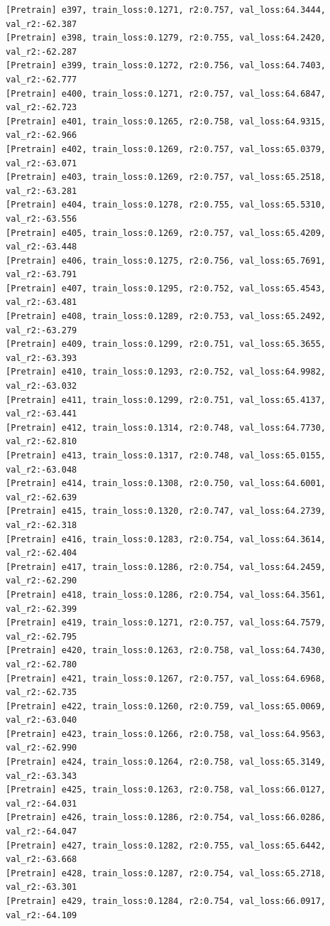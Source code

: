 \documentclass[a4paper, 12pt]{article}
\begin{document}
\begin{lstlisting}
[Pretrain] e397, train_loss:0.1271, r2:0.757, val_loss:64.3444, val_r2:-62.387
[Pretrain] e398, train_loss:0.1279, r2:0.755, val_loss:64.2420, val_r2:-62.287
[Pretrain] e399, train_loss:0.1272, r2:0.756, val_loss:64.7403, val_r2:-62.777
[Pretrain] e400, train_loss:0.1271, r2:0.757, val_loss:64.6847, val_r2:-62.723
[Pretrain] e401, train_loss:0.1265, r2:0.758, val_loss:64.9315, val_r2:-62.966
[Pretrain] e402, train_loss:0.1269, r2:0.757, val_loss:65.0379, val_r2:-63.071
[Pretrain] e403, train_loss:0.1269, r2:0.757, val_loss:65.2518, val_r2:-63.281
[Pretrain] e404, train_loss:0.1278, r2:0.755, val_loss:65.5310, val_r2:-63.556
[Pretrain] e405, train_loss:0.1269, r2:0.757, val_loss:65.4209, val_r2:-63.448
[Pretrain] e406, train_loss:0.1275, r2:0.756, val_loss:65.7691, val_r2:-63.791
[Pretrain] e407, train_loss:0.1295, r2:0.752, val_loss:65.4543, val_r2:-63.481
[Pretrain] e408, train_loss:0.1289, r2:0.753, val_loss:65.2492, val_r2:-63.279
[Pretrain] e409, train_loss:0.1299, r2:0.751, val_loss:65.3655, val_r2:-63.393
[Pretrain] e410, train_loss:0.1293, r2:0.752, val_loss:64.9982, val_r2:-63.032
[Pretrain] e411, train_loss:0.1299, r2:0.751, val_loss:65.4137, val_r2:-63.441
[Pretrain] e412, train_loss:0.1314, r2:0.748, val_loss:64.7730, val_r2:-62.810
[Pretrain] e413, train_loss:0.1317, r2:0.748, val_loss:65.0155, val_r2:-63.048
[Pretrain] e414, train_loss:0.1308, r2:0.750, val_loss:64.6001, val_r2:-62.639
[Pretrain] e415, train_loss:0.1320, r2:0.747, val_loss:64.2739, val_r2:-62.318
[Pretrain] e416, train_loss:0.1283, r2:0.754, val_loss:64.3614, val_r2:-62.404
[Pretrain] e417, train_loss:0.1286, r2:0.754, val_loss:64.2459, val_r2:-62.290
[Pretrain] e418, train_loss:0.1286, r2:0.754, val_loss:64.3561, val_r2:-62.399
[Pretrain] e419, train_loss:0.1271, r2:0.757, val_loss:64.7579, val_r2:-62.795
[Pretrain] e420, train_loss:0.1263, r2:0.758, val_loss:64.7430, val_r2:-62.780
[Pretrain] e421, train_loss:0.1267, r2:0.757, val_loss:64.6968, val_r2:-62.735
[Pretrain] e422, train_loss:0.1260, r2:0.759, val_loss:65.0069, val_r2:-63.040
[Pretrain] e423, train_loss:0.1266, r2:0.758, val_loss:64.9563, val_r2:-62.990
[Pretrain] e424, train_loss:0.1264, r2:0.758, val_loss:65.3149, val_r2:-63.343
[Pretrain] e425, train_loss:0.1263, r2:0.758, val_loss:66.0127, val_r2:-64.031
[Pretrain] e426, train_loss:0.1286, r2:0.754, val_loss:66.0286, val_r2:-64.047
[Pretrain] e427, train_loss:0.1282, r2:0.755, val_loss:65.6442, val_r2:-63.668
[Pretrain] e428, train_loss:0.1287, r2:0.754, val_loss:65.2718, val_r2:-63.301
[Pretrain] e429, train_loss:0.1284, r2:0.754, val_loss:66.0917, val_r2:-64.109

\end{lstlisting}
\end{document}
